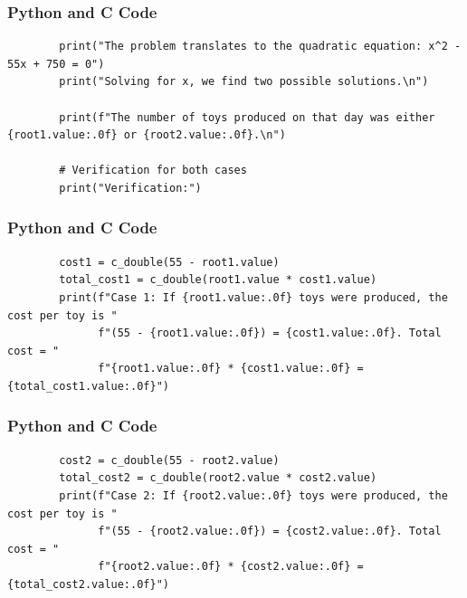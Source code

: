\documentclass{beamer}
\begin{document}
\begin{frame}[fragile]
\frametitle{Python and C Code}
\begin{lstlisting}
        print("The problem translates to the quadratic equation: x^2 - 55x + 750 = 0")
        print("Solving for x, we find two possible solutions.\n")

        print(f"The number of toys produced on that day was either {root1.value:.0f} or {root2.value:.0f}.\n")

        # Verification for both cases
        print("Verification:")
\end{lstlisting}
\end{frame}

\begin{frame}[fragile]
\frametitle{Python and C Code}
\begin{lstlisting}
        cost1 = c_double(55 - root1.value)
        total_cost1 = c_double(root1.value * cost1.value)
        print(f"Case 1: If {root1.value:.0f} toys were produced, the cost per toy is "
              f"(55 - {root1.value:.0f}) = {cost1.value:.0f}. Total cost = "
              f"{root1.value:.0f} * {cost1.value:.0f} = {total_cost1.value:.0f}")
\end{lstlisting}
\end{frame}

\begin{frame}[fragile]
\frametitle{Python and C Code}
\begin{lstlisting}
        cost2 = c_double(55 - root2.value)
        total_cost2 = c_double(root2.value * cost2.value)
        print(f"Case 2: If {root2.value:.0f} toys were produced, the cost per toy is "
              f"(55 - {root2.value:.0f}) = {cost2.value:.0f}. Total cost = "
              f"{root2.value:.0f} * {cost2.value:.0f} = {total_cost2.value:.0f}")
\end{lstlisting}
\end{frame}
\end{document}
